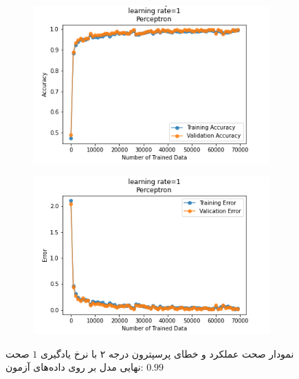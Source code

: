 \documentclass[12pt, a4paper]{article}
\begin{document}
\begin{figure}[h]
    \begin{subfigure}{0.45\linewidth}
        \centering
        \includegraphics[width=\linewidth]{images/6/perceptron/lr/acc_1.png}
    \end{subfigure}
    \hfil
    \begin{subfigure}{0.45\linewidth}
        \centering
        \includegraphics[width=\linewidth]{images/6/perceptron/lr/error_1.png}
    \end{subfigure}
    \caption{نمودار صحت عملکرد‌ و خطای پرسپترون درجه ۲ با نرخ یادگیری $1$
    \newline
    صحت نهایی مدل بر روی داده‌های آزمون: $0.99$}
\end{figure}
\end{document}

